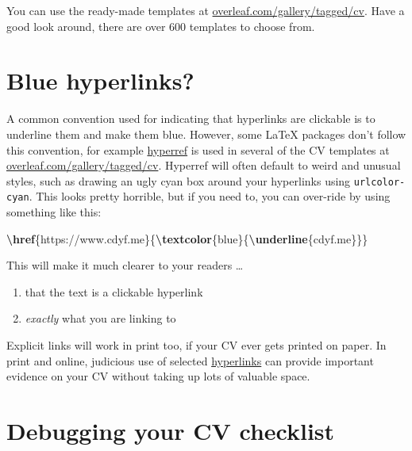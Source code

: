 \documentclass[
]{book}
\newenvironment{Shaded}{\begin{snugshade}}{\end{snugshade}}
\newcommand{\FunctionTok}[1]{\textcolor[rgb]{0.13,0.29,0.53}{\textbf{#1}}}
\newcommand{\NormalTok}[1]{#1}
\providecommand{\tightlist}{%
  \setlength{\itemsep}{0pt}\setlength{\parskip}{0pt}}
\begin{document}
You can use the ready-made templates at \href{https://www.overleaf.com/gallery/tagged/cv}{overleaf.com/gallery/tagged/cv}. Have a good look around, there are over 600 templates to choose from.

\section{Blue hyperlinks?}\label{weird}

A common convention used for indicating that hyperlinks are clickable is to underline them and make them blue. However, some LaTeX packages don't follow this convention, for example \href{https://www.overleaf.com/learn/latex/Hyperlinks}{hyperref} is used in several of the CV templates at \href{https://www.overleaf.com/gallery/tagged/cv}{overleaf.com/gallery/tagged/cv}. Hyperref will often default to weird and unusual styles, such as drawing an ugly cyan box around your hyperlinks using \texttt{urlcolor-cyan}. This looks pretty horrible, but if you need to, you can over-ride by using something like this:

\begin{Shaded}
\begin{Highlighting}[]
\FunctionTok{\textbackslash{}href}\NormalTok{\{https://www.cdyf.me\}\{}\FunctionTok{\textbackslash{}textcolor}\NormalTok{\{blue\}\{}\FunctionTok{\textbackslash{}underline}\NormalTok{\{cdyf.me\}\}\}}
\end{Highlighting}
\end{Shaded}

This will make it much clearer to your readers \ldots{}

\begin{enumerate}
\def\labelenumi{\arabic{enumi}.}
\tightlist
\item
  that the text is a clickable hyperlink
\item
  \emph{exactly} what you are linking to
\end{enumerate}

Explicit links will work in print too, if your CV ever gets printed on paper. In print and online, judicious use of selected \href{https://en.wikipedia.org/wiki/Hyperlink}{hyperlinks} can provide important evidence on your CV without taking up lots of valuable space.

\section{Debugging your CV checklist}\label{debugging-your-cv-checklist}
\end{document}
